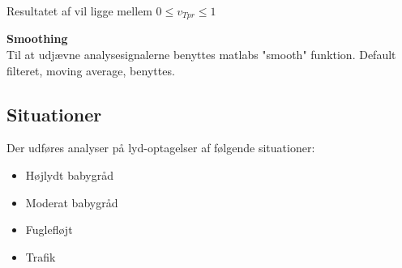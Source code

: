 Resultatet af vil ligge mellem $0\le { v }_{ Tpr }\le 1$

\textbf{Smoothing} \\
Til at udjævne analysesignalerne benyttes matlabs "smooth" funktion. Default filteret, moving average, benyttes.

\subsection{Situationer}
Der udføres analyser på lyd-optagelser af følgende situationer:
\begin{itemize}
	\item Højlydt babygråd
	\item Moderat babygråd
	\item Fuglefløjt
	\item Trafik
\end{itemize} 

\newpage
